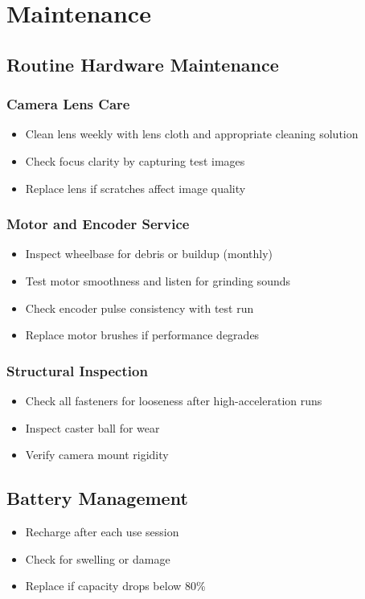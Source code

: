 %
%

\chapter{Maintenance}

\section{Routine Hardware Maintenance}

\subsection{Camera Lens Care}
\begin{itemize}
    \item Clean lens weekly with lens cloth and appropriate cleaning solution
    \item Check focus clarity by capturing test images
    \item Replace lens if scratches affect image quality
\end{itemize}

\subsection{Motor and Encoder Service}
\begin{itemize}
    \item Inspect wheelbase for debris or buildup (monthly)
    \item Test motor smoothness and listen for grinding sounds
    \item Check encoder pulse consistency with test run
    \item Replace motor brushes if performance degrades
\end{itemize}

\subsection{Structural Inspection}
\begin{itemize}
    \item Check all fasteners for looseness after high-acceleration runs
    \item Inspect caster ball for wear
    \item Verify camera mount rigidity
\end{itemize}

\section{Battery Management}

\begin{itemize}
    \item Recharge after each use session
    \item Check for swelling or damage
    \item Replace if capacity drops below 80\%
\end{itemize}





